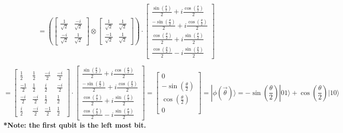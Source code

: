 \documentclass{article}
\begin{document}
\begin{itemize}
    \[
    =
    \left(
    \begin{bmatrix}
        \frac{1}{\sqrt{2}} & \frac{-i}{\sqrt{2}} \\
        \frac{-i}{\sqrt{2}} & \frac{1}{\sqrt{2}}
    \end{bmatrix}
    \otimes
    \begin{bmatrix}
        \frac{1}{\sqrt{2}} &  \frac{1}{\sqrt{2}} \\
        \frac{-1}{\sqrt{2}} & \frac{1}{\sqrt{2}} 
    \end{bmatrix}
    \right)
    \cdot
    \begin{bmatrix}
        \frac{\sin \left(\frac{\theta}{2}\right)}{2} + i \frac{\cos \left(\frac{\theta}{2}\right)}{2} \\
        \frac{-\sin \left(\frac{\theta}{2}\right)}{2} + i \frac{\cos \left(\frac{\theta}{2}\right)}{2} \\
        \frac{\cos \left(\frac{\theta}{2}\right)}{2} + i \frac{\sin \left(\frac{\theta}{2}\right)}{2} \\
        \frac{\cos \left(\frac{\theta}{2}\right)}{2} - i \frac{\sin \left(\frac{\theta}{2}\right)}{2} 
    \end{bmatrix}
    \]

    \begin{equation}
    \label{eq:1}
    =
    \begin{bmatrix}
        \frac{1}{2} & \frac{1}{2} & \frac{-i}{2} & \frac{-i}{2} \\
        \frac{-1}{2} & \frac{1}{2} & \frac{i}{2} & \frac{-i}{2} \\
        \frac{-i}{2} & \frac{-i}{2} & \frac{1}{2} & \frac{1}{2} \\
        \frac{i}{2} & \frac{-i}{2} & \frac{-1}{2} & \frac{1}{2}
    \end{bmatrix}
    \cdot
    \begin{bmatrix}
        \frac{\sin \left(\frac{\theta}{2}\right)}{2} + i \frac{\cos \left(\frac{\theta}{2}\right)}{2} \\
        \frac{-\sin \left(\frac{\theta}{2}\right)}{2} + i \frac{\cos \left(\frac{\theta}{2}\right)}{2} \\
        \frac{\cos \left(\frac{\theta}{2}\right)}{2} + i \frac{\sin \left(\frac{\theta}{2}\right)}{2} \\
        \frac{\cos \left(\frac{\theta}{2}\right)}{2} - i \frac{\sin \left(\frac{\theta}{2}\right)}{2} 
    \end{bmatrix}
    = 
    \begin{bmatrix}
        0 \\
        - \sin(\frac{\theta}{2}) \\
        \cos(\frac{\theta}{2}) \\
        0
    \end{bmatrix}
    = |\phi(\vec{\theta}) \rangle = -\sin\left(\frac{\theta}{2}\right) |01 \rangle + \cos\left(\frac{\theta}{2}\right) |10 \rangle
    \end{equation}
    \textbf{*Note: the first qubit is the left most bit.} 


\end{itemize}
\end{document}
